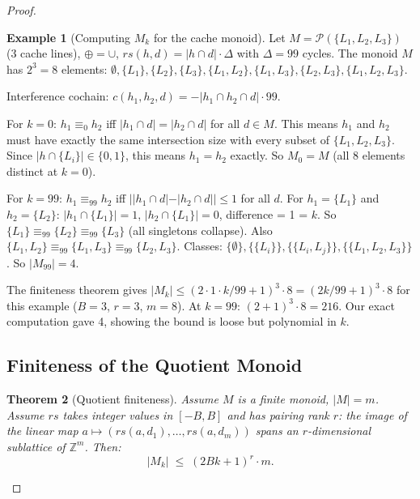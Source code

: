 \documentclass[acmsmall,sigplan,anonymous,review,screen]{acmart}
\theoremstyle{plain}
\newtheorem{theorem}{Theorem}[section]
\theoremstyle{definition}
\newtheorem{example}[theorem]{Example}
\newcommand{\rs}{\mathit{rs}}
\begin{document}
\begin{proof}
\begin{example}[Computing $M_k$ for the cache monoid]
\label{ex:cache-mk}
  Let $M = \mathcal{P}(\{L_1, L_2, L_3\})$ (3 cache lines), $\oplus = \cup$,
  $\rs(h, d) = |h \cap d| \cdot \Delta$ with $\Delta = 99$ cycles.
  The monoid $M$ has $2^3 = 8$ elements: $\emptyset, \{L_1\}, \{L_2\},
  \{L_3\}, \{L_1, L_2\}, \{L_1, L_3\}, \{L_2, L_3\}, \{L_1, L_2, L_3\}$.

  Interference cochain: $c(h_1, h_2, d) = -|h_1 \cap h_2 \cap d| \cdot 99$.

  For $k = 0$: $h_1 \equiv_0 h_2$ iff $|h_1 \cap d| = |h_2 \cap d|$ for all $d \in M$.
  This means $h_1$ and $h_2$ must have exactly the same
  intersection size with every subset of $\{L_1, L_2, L_3\}$.
  Since $|h \cap \{L_i\}| \in \{0, 1\}$, this means $h_1 = h_2$ exactly.
  So $M_0 = M$ (all 8 elements distinct at $k = 0$).

  For $k = 99$: $h_1 \equiv_{99} h_2$ iff $||h_1 \cap d| - |h_2 \cap d|| \leq 1$
  for all $d$.  For $h_1 = \{L_1\}$ and $h_2 = \{L_2\}$:
  $|h_1 \cap \{L_1\}| = 1$, $|h_2 \cap \{L_1\}| = 0$, difference = 1 = $k$.
  So $\{L_1\} \equiv_{99} \{L_2\} \equiv_{99} \{L_3\}$ (all singletons collapse).
  Also $\{L_1, L_2\} \equiv_{99} \{L_1, L_3\} \equiv_{99} \{L_2, L_3\}$.
  Classes: $\{\emptyset\}, \{\{L_i\}\}, \{\{L_i, L_j\}\}, \{\{L_1,L_2,L_3\}\}$.
  So $|M_{99}| = 4$.

  The finiteness theorem gives $|M_k| \leq (2 \cdot 1 \cdot k/99 + 1)^3 \cdot 8 =
  (2k/99 + 1)^3 \cdot 8$ for this example ($B = 3$, $r = 3$, $m = 8$).
  At $k = 99$: $(2+1)^3 \cdot 8 = 216$.  Our exact computation gave 4,
  showing the bound is loose but polynomial in $k$.
\end{example}

\subsection{Finiteness of the Quotient Monoid}
\label{sec:decidability:finite}

\begin{theorem}[Quotient finiteness]
\label{thm:finite}
  Assume $M$ is a finite monoid, $|M| = m$.  Assume $\rs$ takes integer
  values in $[-B, B]$ and has \emph{pairing rank} $r$: the image of the
  linear map $a \mapsto (\rs(a, d_1), \ldots, \rs(a, d_m))$ spans an
  $r$-dimensional sublattice of $\mathbb{Z}^m$.  Then:
  \[
    |M_k| \;\leq\; (2Bk + 1)^r \cdot m.
  \]
\end{theorem}


\end{proof}
\end{document}

